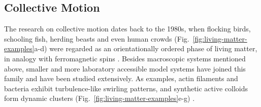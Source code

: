 \subsection{Collective Motion}
The research on collective motion dates back to the 1980s, when flocking birds, schooling fish, herding beasts and even human crowds (Fig.~\ref{fig:living-matter-examples}a-d) were regarded as an orientationally ordered phase of living matter, in analogy with ferromagnetic spins
\cite{Reynolds1987, Vicsek1995, Narayan2007, Ward2008, Ballerini2008, Silverberg2013}. Besides macroscopic systems mentioned above, smaller and more laboratory accessible model systems have joined this family and have been studied extensively. As examples, actin filaments and bacteria exhibit turbulence-like swirling patterns, and synthetic active colloids form dynamic clusters (Fig.~\ref{fig:living-matter-examples}e-g)
\cite{Dunkel2013a, Wensink2012, Buttinoni2013, Palacci2013, Sanchez2012, Schaller2010, Sokolov2007}.


